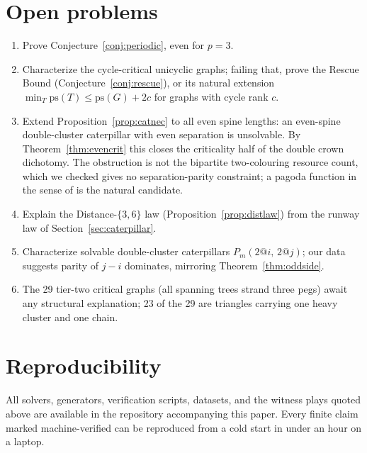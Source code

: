 \documentclass[11pt]{article}
\theoremstyle{definition}
\newcommand{\ps}{\mathrm{ps}}
\begin{document}
\section{Open problems}

\begin{enumerate}
\item Prove Conjecture~\ref{conj:periodic}, even for $p=3$.
\item Characterize the cycle-critical unicyclic graphs; failing
that, prove the Rescue Bound (Conjecture~\ref{conj:rescue}), or its
natural extension $\min_T\ps(T)\le\ps(G)+2c$ for graphs with cycle
rank $c$.
\item Extend Proposition~\ref{prop:catnec} to all even spine lengths:
an even-spine double-cluster caterpillar with even separation is
unsolvable. By Theorem~\ref{thm:evencrit} this closes the criticality
half of the double crown dichotomy. The obstruction is not the
bipartite two-colouring resource count, which we checked gives no
separation-parity constraint; a pagoda function in the sense of
\cite{Kpagoda} is the natural candidate.
\item Explain the Distance-$\{3,6\}$ law
(Proposition~\ref{prop:distlaw}) from the runway law of
Section~\ref{sec:caterpillar}.
\item Characterize solvable double-cluster caterpillars
$P_m(2\!@\!i,\,2\!@\!j)$; our data suggests parity of $j-i$
dominates, mirroring Theorem~\ref{thm:oddside}.
\item The 29 tier-two critical graphs (all spanning trees strand
three pegs) await any structural explanation; 23 of the 29 are
triangles carrying one heavy cluster and one chain.
\end{enumerate}

\section*{Reproducibility}

All solvers, generators, verification scripts, datasets, and the
witness plays quoted above are available in the repository
accompanying this paper. Every finite claim marked machine-verified
can be reproduced from a cold start in under an hour on a laptop.
\end{document}
